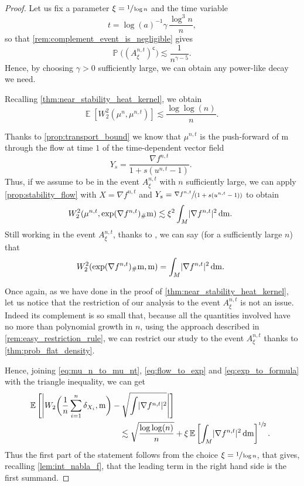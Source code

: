 \documentclass[10pt]{amsart}
\newcommand{\spfrac}[2]{\sfrac{#1}{(#2)}}
\theoremstyle{plain}
\theoremstyle{definition}
\numberwithin{equation}{section}
\renewcommand{\complement}{\ensuremath{\mathsf{c}}}\newcommand{\de}{\ensuremath{\,\mathrm d}}
\newcommand{\E}[1]{\ensuremath{\operatorname{\mathbb{E}}\left[#1\right]}}
\newcommand{\bP}[1]{\ensuremath{\operatorname{\mathbb{P}}\bigl(#1\bigr)}}
\newcommand{\fullstop}{\ensuremath{\text{. }}}
\newcommand{\m}{\ensuremath{\mathrm m}}
\DeclarePairedDelimiter\abs{\lvert}{\rvert}
\begin{document}
\begin{proof}
Let us fix a parameter $\xi=\sfrac1{\log n}$ and the time variable
\[
t=\log(a)^{-1}\gamma\,\frac{\log^3n}{n},
\]
so that \cref{rem:complement_event_is_negligible} gives
$$
\bP{(A^{n,t}_{\xi})^{\complement}} \lesssim \frac{1}{n^{\gamma-5}}\fullstop
$$
Hence, by choosing $\gamma>0$ sufficiently large, we can obtain any power-like decay we need.

Recalling \cref{thm:near_stability_heat_kernel}, we obtain
\begin{equation}\label{eq:mu_n_to_mu_nt}
\E{W^2_2(\mu^n,\mu^{n,t})} \lesssim \frac{\log\log(n)}n \fullstop
\end{equation}

Thanks to \cref{prop:transport_bound} we know that $\mu^{n,t}$ is the push-forward of $\m$ through the
flow at time $1$ of the time-dependent vector field
\begin{equation*}
Y_s = \frac{\nabla f^{n,t}}{1 + s(u^{n,t}-1)} \fullstop
\end{equation*}
Thus, if we assume to be in the event $A^{n,t}_\xi$ with $n$ sufficiently large,
we can apply \cref{prop:stability_flow} with $X=\nabla f^{n,t}$ and
$Y_s=\spfrac{\nabla f^{n,t}}{1 + s(u^{n,t}-1)}$ to obtain
\begin{equation}\label{eq:flow_to_exp}
W^2_2(\mu^{n,t}, \exp(\nabla f^{n,t})_\#\m)
\lesssim
\xi^2\int_M \abs{\nabla f^{n,t}}^2\de\m \fullstop
\end{equation}
Still working in the event $A^{n,t}_\xi$, thanks to \cite[Th.\,1.1]{Glaudo19}, we can say
(for a sufficiently large $n$) that
\begin{equation}\label{eq:exp_to_formula}
W^2_2(\exp(\nabla f^{n,t})_\#\m, \m) = \int_M \abs{\nabla f^{n,t}}^2 \de\m\fullstop
\end{equation}

Once again, as we have done in the proof of \cref{thm:near_stability_heat_kernel},
let us notice that the restriction of our analysis to the event $A^{n,t}_\xi$ is not an issue.
Indeed its complement is so small that,
because all the quantities involved have no more than polynomial growth in $n$, using
the approach described in \cref{rem:easy_restriction_rule}, we can restrict our study to the
event $A^{n,t}_\xi$ thanks to \cref{thm:prob_flat_density}.

Hence, joining \cref{eq:mu_n_to_mu_nt}, \cref{eq:flow_to_exp} and \cref{eq:exp_to_formula}
with the triangle inequality, we can get
\begin{align*}
\E{\abs*{W_2\biggl(\frac1n\sum_{i=1}^n\delta_{X_i}, \m\biggr)
- \sqrt{\int \abs{\nabla f^{n,t}}^2}}} &\\
\lesssim
\sqrt{\frac{\log\log(n)}n} &
+
\xi\E{\int_M \abs{\nabla f^{n,t}}^2\de\m}^{\sfrac12}\fullstop
\end{align*}
Thus the first part of the statement follows from the choice $\xi=\sfrac{1}{\log n}$,
that gives, recalling \cref{lem:int_nabla_f}, that the leading term in the right hand side
is the first summand.


\end{proof}
\end{document}
